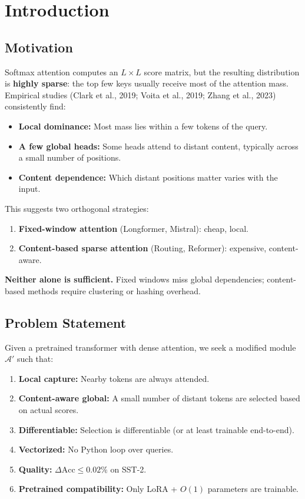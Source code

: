 
\section{Introduction}

\subsection{Motivation}

Softmax attention computes an $L \times L$ score matrix, but the resulting 
distribution is \textbf{highly sparse}: the top few keys usually receive most 
of the attention mass. Empirical studies (Clark et al., 2019; Voita et al., 
2019; Zhang et al., 2023) consistently find:

\begin{itemize}
\item \textbf{Local dominance:} Most mass lies within a few tokens of the query.
\item \textbf{A few global heads:} Some heads attend to distant content, typically
  across a small number of positions.
\item \textbf{Content dependence:} Which distant positions matter varies with the
  input.

\end{itemize}
This suggests two orthogonal strategies:

\begin{enumerate}
\item \textbf{Fixed-window attention} (Longformer, Mistral): cheap, local.
\item \textbf{Content-based sparse attention} (Routing, Reformer): expensive,
  content-aware.

\end{enumerate}
\textbf{Neither alone is sufficient.} Fixed windows miss global dependencies; 
content-based methods require clustering or hashing overhead.

\subsection{Problem Statement}

Given a pretrained transformer with dense attention, we seek a modified 
module $\mathcal{A}'$ such that:

\begin{enumerate}
\item \textbf{Local capture:} Nearby tokens are always attended.
\item \textbf{Content-aware global:} A small number of distant tokens are selected
  based on actual scores.
\item \textbf{Differentiable:} Selection is differentiable (or at least
  trainable end-to-end).
\item \textbf{Vectorized:} No Python loop over queries.
\item \textbf{Quality:} $\Delta\text{Acc} \leq 0.02\%$ on SST-2.
\item \textbf{Pretrained compatibility:} Only LoRA + $O(1)$ parameters are trainable.

\end{enumerate}
